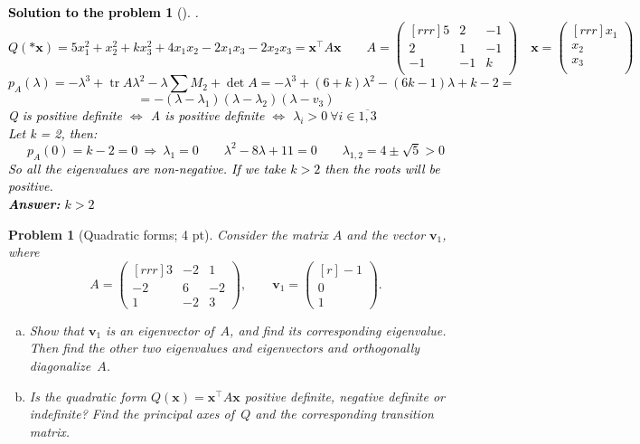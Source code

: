 \documentclass[12pt,a4]{article}
\newtheorem{problem}{Problem}
\newtheorem{solution}{Solution to the problem}
\newcommand\trace{\operatorname{tr}}
\newcommand{\bv}{{\mathbf v}}
\newcommand{\bx}{{\mathbf x}}
\newcommand{\answer}[1]{\textbf{Answer:} #1}
\begin{document}
\textcolor{black}{
\begin{solution}[]\rm .
\[
Q(*\bx) = 5x_1^2 + x_2^2 + kx_3^2 + 4x_1x_2 -2x_1x_3 -2x_2x_3 = \bx^\top A \bx
\qquad
A = 
\begin{pmatrix}[rrr]
5 & 2 & -1 \\
2 & 1 & -1\\
-1 & -1 & k\\
\end{pmatrix}
\quad
\bx =
\begin{pmatrix}[rrr]
x_1 \\ x_2 \\ x_3 \\
\end{pmatrix}
\]
\[
p_A(\lambda) = - \lambda^3 + \trace A \lambda^2 - \lambda \sum M_2 + \det A =  - \lambda^3 + (6 + k) \lambda^2 - (6k-1) \lambda + k-2 =
\]
\[
= - (\lambda - \lambda_1)(\lambda - \lambda_2)(\lambda - v_3)
\]
Q is positive definite $\Leftrightarrow$ A is positive definite $\Leftrightarrow$ $\lambda_i > 0 ~ \forall i \in \overline{1,3}$\\
Let k = 2, then:
\[
p_A(0) = k - 2 = 0
~ \Rightarrow ~ \lambda_1 = 0
\qquad
\lambda^2 - 8 \lambda + 11 = 0
\qquad
\lambda_{1,2} = 4 \pm \sqrt5 > 0
\]
So all the eigenvalues are non-negative. If we take $k>2$ then the roots will be positive.\\
\answer{ $k > 2$}
\end{solution}
}


\begin{problem}[Quadratic forms; 4 pt]\rm
	Consider the matrix $A$ and the vector $\bv_1$, where
	\[
	A = \begin{pmatrix}[rrr]
	3 &-2 & 1 \\ - 2 & 6 & -2 \\ 1 & -2 & 3
	\end{pmatrix},
	\qquad
	\bv_1 = \begin{pmatrix}[r]-1 \\ 0 \\ 1\end{pmatrix}.
	\]
	\begin{enumerate}[(a)]
		\item Show that $\bv_1$ is an eigenvector of~$A$, and find its corresponding eigenvalue. Then find the other two eigenvalues and eigenvectors and orthogonally diagonalize~$A$.
		\item Is the quadratic form $Q(\bx) =\bx^\top A \bx$ positive definite, negative definite or indefinite?
		Find the principal axes of~$Q$ and the corresponding transition matrix.
	\end{enumerate}
\end{problem}
\end{document}
